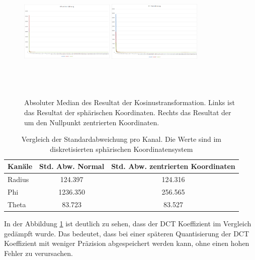 \begin{figure}[!htbp]
	\center
	\includegraphics[width=0.4\textwidth,height=6cm,keepaspectratio]{./pictures/resultate/loesung1/spherical_normal.png}
	\includegraphics[width=0.4\textwidth,height=6cm,keepaspectratio]{./pictures/resultate/loesung1/spherical_moved.png}
	\caption{Absoluter Median des Resultat der Kosinustransformation. Links ist das Resultat der sphärischen Koordinaten. Rechts das Resultat der um den Nullpunkt zentrierten Koordinaten.}
	\label{resultate:loesung1:poc:wertebereich}
\end{figure} 
\begin{table}[!htbp]
\center
	\begin{tabular}{l|c|c}
	 Kanäle & Std. Abw. Normal &  Std. Abw. zentrierten Koordinaten\\\hline
	 Radius & 124.397 & 124.316\\
	 Phi & 1236.350 & 256.565\\
	 Theta & 83.723 & 83.527\\
	\end{tabular}
	\caption{Vergleich der Standardabweichung pro Kanal. Die Werte sind im diskretisierten sphärischen Koordinatensystem}
	\label{resultate:loesung1:poc:wertebereich_tabelle}
\end{table}
In der Abbildung \ref{resultate:loesung1:poc:wertebereich} ist deutlich zu sehen, dass der DCT Koeffizient im Vergleich gedämpft wurde. Das bedeutet, dass bei einer späteren Quantisierung der DCT Koeffizient mit weniger Präzision abgespeichert werden kann, ohne einen hohen Fehler zu verursachen.\\
